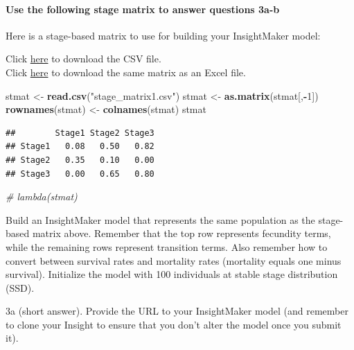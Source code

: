 \documentclass[
]{article}
\newenvironment{Shaded}{\begin{snugshade}}{\end{snugshade}}
\newcommand{\CommentTok}[1]{\textcolor[rgb]{0.56,0.35,0.01}{\textit{#1}}}
\newcommand{\DecValTok}[1]{\textcolor[rgb]{0.00,0.00,0.81}{#1}}
\newcommand{\FunctionTok}[1]{\textcolor[rgb]{0.13,0.29,0.53}{\textbf{#1}}}
\newcommand{\NormalTok}[1]{#1}
\newcommand{\OtherTok}[1]{\textcolor[rgb]{0.56,0.35,0.01}{#1}}
\newcommand{\SpecialCharTok}[1]{\textcolor[rgb]{0.81,0.36,0.00}{\textbf{#1}}}
\newcommand{\StringTok}[1]{\textcolor[rgb]{0.31,0.60,0.02}{#1}}
\begin{document}
\hypertarget{use-the-following-stage-matrix-to-answer-questions-3a-b}{%
\paragraph{Use the following stage matrix to answer questions
3a-b}\label{use-the-following-stage-matrix-to-answer-questions-3a-b}}

Here is a stage-based matrix to use for building your InsightMaker
model:

Click \href{stage_matrix1.csv}{here} to download the CSV file.\\
Click \href{stage_matrix1.xlsx}{here} to download the same matrix as an
Excel file.

\begin{Shaded}
\begin{Highlighting}[]
\NormalTok{stmat }\OtherTok{\textless{}{-}} \FunctionTok{read.csv}\NormalTok{(}\StringTok{"stage\_matrix1.csv"}\NormalTok{)}
\NormalTok{stmat }\OtherTok{\textless{}{-}} \FunctionTok{as.matrix}\NormalTok{(stmat[,}\SpecialCharTok{{-}}\DecValTok{1}\NormalTok{])}
\FunctionTok{rownames}\NormalTok{(stmat) }\OtherTok{\textless{}{-}} \FunctionTok{colnames}\NormalTok{(stmat)}
\NormalTok{stmat}
\end{Highlighting}
\end{Shaded}

\begin{verbatim}
##        Stage1 Stage2 Stage3
## Stage1   0.08   0.50   0.82
## Stage2   0.35   0.10   0.00
## Stage3   0.00   0.65   0.80
\end{verbatim}

\begin{Shaded}
\begin{Highlighting}[]
\CommentTok{\# lambda(stmat) }
\end{Highlighting}
\end{Shaded}

Build an InsightMaker model that represents the same population as the
stage-based matrix above. Remember that the top row represents fecundity
terms, while the remaining rows represent transition terms. Also
remember how to convert between survival rates and mortality rates
(mortality equals one minus survival). Initialize the model with 100
individuals at stable stage distribution (SSD).

3a (short answer). Provide the URL to your InsightMaker model (and
remember to clone your Insight to ensure that you don't alter the model
once you submit it).
\end{document}
